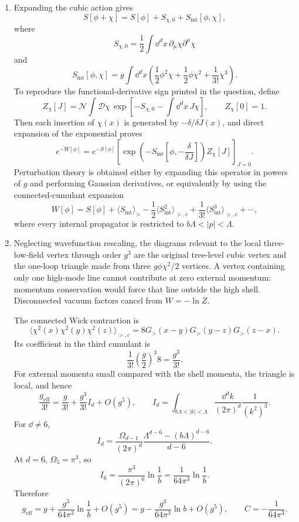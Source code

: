 \begin{enumerate}
\begin{enumerate}
\item
Expanding the cubic action gives
\[
 S[\phi+\chi]=S[\phi]+S_{\chi,0}+S_{\mathrm{int}}[\phi,\chi],
\]
where
\[
 S_{\chi,0}=\frac12\int \dd^dx\,\partial_\mu\chi\partial^\mu\chi
\]
and
\[
 \boxed{\;
 S_{\mathrm{int}}[\phi,\chi]
 =g\int \dd^dx\left(
 \frac12\phi^2\chi+\frac12\phi\chi^2+\frac1{3!}\chi^3
 \right).\;}
\]
To reproduce the functional-derivative sign printed in the question,
define
\[
 Z_\chi[J]=\mathcal N\int\mathcal D\chi\,
 \exp\left[-S_{\chi,0}-\int \dd^dx\,J\chi\right],
 \qquad Z_\chi[0]=1.
\]
Then each insertion of \(\chi(x)\) is generated by
\(-\delta/\delta J(x)\), and direct expansion of the exponential proves
\[
 e^{-W[\phi]}=e^{-S[\phi]}
 \left[
 \exp\left(-S_{\mathrm{int}}
 \left[\phi,-\frac{\delta}{\delta J}\right]\right)Z_\chi[J]
 \right]_{J=0}.
\]
Perturbation theory is obtained either by expanding this operator in powers
of \(g\) and performing Gaussian derivatives, or equivalently by using the
connected-cumulant expansion
\[
 W[\phi]=S[\phi]+\langle S_{\mathrm{int}}\rangle_>
 -\frac12\langle S_{\mathrm{int}}^2\rangle_{>,c}
 +\frac1{3!}\langle S_{\mathrm{int}}^3\rangle_{>,c}+\cdots,
\]
where every internal propagator is restricted to
\(b\Lambda<|p|<\Lambda\).

\item
Neglecting wavefunction rescaling, the diagrams relevant to the local
three-low-field vertex through order \(g^3\) are the original tree-level
cubic vertex and the one-loop triangle made from three
\(g\phi\chi^2/2\) vertices.  A vertex containing only one high-mode line
cannot contribute at zero external momentum: momentum conservation would
force that line outside the high shell.  Disconnected vacuum factors cancel
from \(W=-\ln Z\).

The connected Wick contraction is
\[
 \langle\chi^2(x)\chi^2(y)\chi^2(z)\rangle_{>,c}
 =8G_>(x-y)G_>(y-z)G_>(z-x).
\]
Its coefficient in the third cumulant is
\[
 \frac1{3!}\left(\frac g2\right)^3 8=\frac{g^3}{3!}.
\]
For external momenta small compared with the shell momenta, the triangle is
local, and hence
\[
 \frac{g_{\mathrm{eff}}}{3!}
 =\frac g{3!}+\frac{g^3}{3!}I_d+O(g^5),
 \qquad
 I_d=\int_{b\Lambda<|k|<\Lambda}
 \frac{\dd^dk}{(2\pi)^d}\frac1{(k^2)^3}.
\]
For \(\dd\neq6\),
\[
 I_d=\frac{\Omega_{d-1}}{(2\pi)^d}
 \frac{\Lambda^{d-6}-(b\Lambda)^{d-6}}{d-6}.
\]
At \(d=6\), \(\Omega_5=\pi^3\), so
\[
 I_6=\frac{\pi^3}{(2\pi)^6}\ln\frac1b
 =\frac1{64\pi^3}\ln\frac1b.
\]
Therefore
\[
 \boxed{\;
 g_{\mathrm{eff}}
 =g+\frac{g^3}{64\pi^3}\ln\frac1b+O(g^5)
 =g-\frac{g^3}{64\pi^3}\ln b+O(g^5),
 \qquad C=-\frac1{64\pi^3}.\;}
\]
\end{enumerate}


\end{enumerate}
